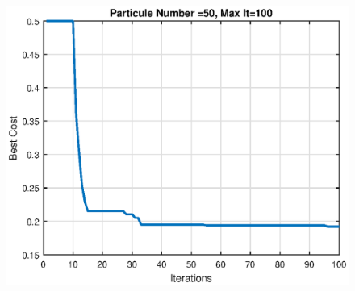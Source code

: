 \begin{figure}[H]
	\begin{minipage}[b]{0.5\linewidth}
	\centering
	\includegraphics[width=\textwidth]{../figures/ares.eps}
	\caption{}
	\label{}
	\end{minipage}\hfill
	\begin{minipage}[b]{0.5\textwidth}
	
	\caption{}
	\label{}
	\end{minipage}
\end{figure}